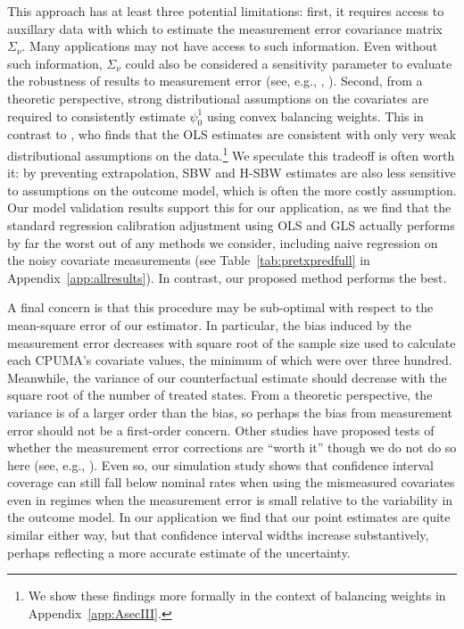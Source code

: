 \documentclass[aoas]{imsart}
\theoremstyle{plain}
\theoremstyle{remark}
\begin{document}
This approach has at least three potential limitations: first, it requires access to auxillary data with which to estimate the measurement error covariance matrix $\Sigma_{\nu}$. Many applications may not have access to such information. Even without such information, $\Sigma_{\nu}$ could also be considered a sensitivity parameter to evaluate the robustness of results to measurement error (see, e.g., \cite{huque2014impact}, \cite{illenberger2020impact}). Second, from a theoretic perspective, strong distributional assumptions on the covariates are required to consistently estimate $\psi_0^1$ using convex balancing weights. This in contrast to \cite{gleser1992importance}, who finds that the OLS estimates are consistent with only very weak distributional assumptions on the data.\footnote{We show these findings more formally in the context of balancing weights in Appendix~\ref{app:AsecIII}.} We speculate this tradeoff is often worth it: by preventing extrapolation, SBW and H-SBW estimates are also less sensitive to assumptions on the outcome model, which is often the more costly assumption. Our model validation results support this for our application, as we find that the standard regression calibration adjustment using OLS and GLS actually performs by far the worst out of any methods we consider, including naive regression on the noisy covariate measurements (see Table~\ref{tab:pretxpredfull} in Appendix~\ref{app:allresults}). In contrast, our proposed method performs the best.

A final concern is that this procedure may be sub-optimal with respect to the mean-square error of our estimator. In particular, the bias induced by the measurement error decreases with square root of the sample size used to calculate each CPUMA's covariate values, the minimum of which were over three hundred. Meanwhile, the variance of our counterfactual estimate should decrease with the square root of the number of treated states. From a theoretic perspective, the variance is of a larger order than the bias, so perhaps the bias from measurement error should not be a first-order concern. Other studies have proposed tests of whether the measurement error corrections are ``worth it'' though we do not do so here (see, e.g., \cite{gleser1992importance}). Even so, our simulation study shows that confidence interval coverage can still fall below nominal rates when using the mismeasured covariates even in regimes when the measurement error is small relative to the variability in the outcome model. In our application we find that our point estimates are quite similar either way, but that confidence interval widths increase substantively, perhaps reflecting a more accurate estimate of the uncertainty.
\end{document}
